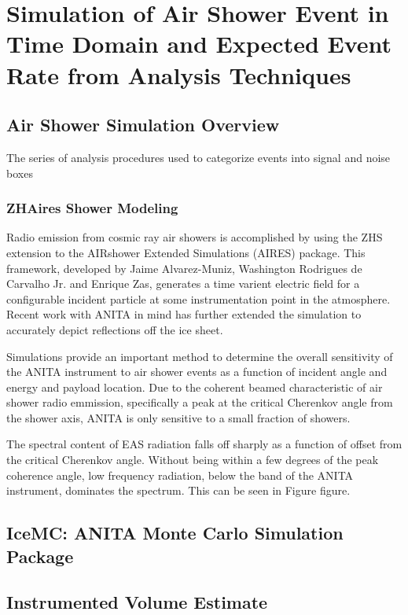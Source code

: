 \chapter{Simulation of Air Shower Event in Time Domain and Expected Event Rate from Analysis Techniques}
\section{Air Shower Simulation Overview}
	The series of analysis procedures used to categorize events into signal and noise boxes
	\subsection{ZHAires Shower Modeling}
		Radio emission from cosmic ray air showers is accomplished by using the ZHS extension to the AIRshower Extended Simulations (AIRES) package.\cite{AlvarezMuñiz2012325}  This framework, developed by Jaime Alvarez-Muniz, Washington Rodrigues de Carvalho Jr. and Enrique Zas, generates a time varient electric field for a configurable incident particle at some instrumentation point in the atmosphere.  Recent work with ANITA in mind has further extended the simulation to accurately depict reflections off the ice sheet.
		
		Simulations provide an important method to determine the overall sensitivity of the ANITA instrument to air shower events as a function of incident angle and energy and payload location.  Due to the coherent beamed characteristic of air shower radio emmission, specifically a peak at the critical Cherenkov angle from the shower axis, ANITA is only sensitive to a small fraction of showers.
		
		The spectral content of EAS radiation falls off sharply as a function of offset from the critical Cherenkov angle.  Without being within a few degrees of the peak coherence angle, low frequency radiation, below the band of the ANITA instrument, dominates the spectrum.  This can be seen in Figure figure.  
		
\section{IceMC: ANITA Monte Carlo Simulation Package}
	
\section{Instrumented Volume Estimate}